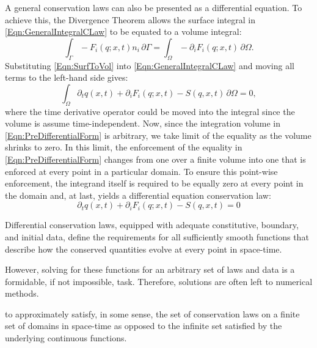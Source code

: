 \documentclass[Prelim,12pt]{WisconsinThesis}
\newcommand{\pdt}{\partial_t}
\newcommand{\pdi}{\partial_i}
\newcommand{\V}  {\ensuremath{\Omega}}
\newcommand{\dV} {\,\partial\V}
\newcommand{\IntV} {\int_{\V}}
\renewcommand{\S}  {\ensuremath{\Gamma}}
\newcommand{\dS} {\,\partial\S}
\newcommand{\IntS} {\int_{\S}}
\newcommand{\q}{\ensuremath{q}}
\begin{document}
A general conservation laws can also be presented as a differential equation.
To achieve this, the Divergence Theorem allows the surface integral in \cref{Eqn:GeneralIntegralCLaw} to be equated to a volume integral:
\begin{equation}
    \IntS -F_i(q;x,t) n_i\dS = \IntV - \pdi F_i(q;x,t) \dV.
    \label{Eqn:SurfToVol}
\end{equation}
Substituting \cref{Eqn:SurfToVol} into \cref{Eqn:GeneralIntegralCLaw} and moving all terms to the left-hand side gives:
\begin{equation}%
    \IntV \pdt\q(x,t) + \pdi F_i(q;x,t) - S(q,x,t) \dV = 0,
    \label{Eqn:PreDifferentialForm}
\end{equation}
where the time derivative operator could be moved into the integral since the volume is assume time-independent.
Now, since the integration volume in \cref{Eqn:PreDifferentialForm} is arbitrary, we take limit of the equality as the volume shrinks to zero.
In this limit, the enforcement of the equality in \cref{Eqn:PreDifferentialForm} changes from one over a finite volume into one that is enforced at every point in a particular domain.
To ensure this point-wise enforcement, the integrand itself is required to be equally zero at every point in the domain and, at last, yields a differential equation conservation law:
\begin{equation}%
    \pdt\q(x,t) + \pdi F_i(q;x,t) - S(q,x,t) = 0
    \label{Eqn:GeneralDifferentialCLaw}
\end{equation}



Differential conservation laws, equipped with adequate constitutive, boundary, and initial data, define the requirements for all sufficiently smooth functions that describe how the conserved quantities evolve at every point in space-time.

However, solving for these functions for an arbitrary set of laws and data is a formidable, if not impossible, task.
Therefore, solutions are often left to numerical methods.

to approximately satisfy, in some sense, the set of conservation laws on a finite set of domains in space-time as opposed to the infinite set satisfied by the underlying continuous functions.
\end{document}
